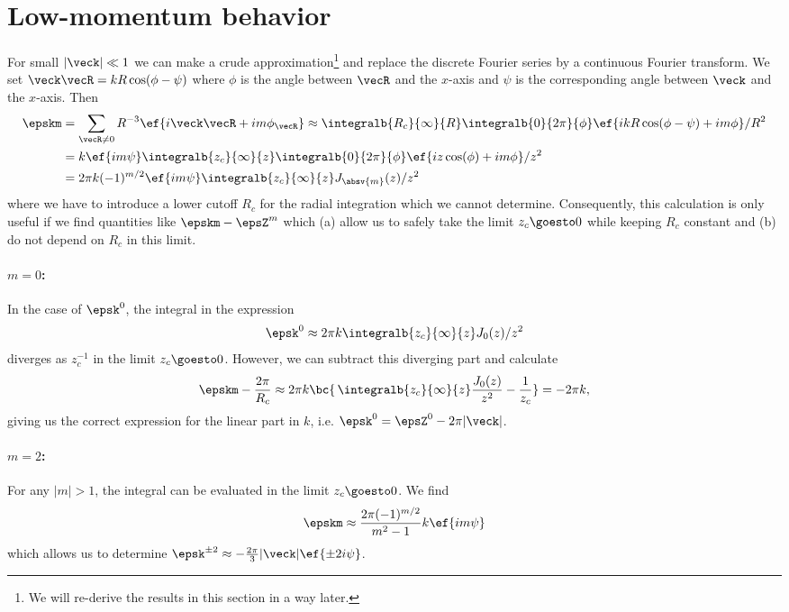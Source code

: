 \section{Low-momentum behavior}
For small $|\veck| \ll 1$ we can make a crude approximation\footnote{We will re-derive the results in this section in a  way later.} and replace the discrete Fourier series
by a continuous Fourier transform. We set $\veck\vecR = k R \cos(\phi-\psi)$ where
$\phi$ is the angle between $\vecR$ and the $x$-axis and $\psi$ is the
corresponding angle between $\veck$ and the $x$-axis. Then
\begin{align}
    \epskm &= \sum_{\vecR\ne 0} R^{-3} \ef{i\veck\vecR+i m \phi_\vecR}
    \approx \integralb{R_c}{\infty}{R} \integralb{0}{2\pi}{\phi} \ef{ikR \cos(\phi-\psi) + i m \phi} / R^2\\
    &= k \ef{im \psi} \integralb{z_c}{\infty}{z} \integralb{0}{2\pi}{\phi} \ef{i z \cos(\phi) + i m \phi} / z^2\\
    &= 2\pi k (-1)^{m/2} \ef{i m \psi} \integralb{z_c}{\infty}{z} J_{\absv{m}}(z)/z^2
\end{align}
where we have to introduce a lower cutoff $R_c$ for the radial integration which
we cannot determine. Consequently, this calculation is only useful
if we find quantities like $\epskm-\epsZ^m$ which (a) allow
us to safely take the limit $z_c \goesto 0$ while keeping $R_c$ constant and
(b) do not depend on $R_c$ in this limit.

\paragraph{$m=0$:} In the case of $\epsk^0$, the integral in the expression
\begin{align}
    \epsk^0 \approx 2\pi k \integralb{z_c}{\infty}{z} J_0(z)/z^2
\end{align}
diverges as $z_c^{-1}$ in the limit $z_c \goesto 0$. However, we can subtract this diverging part and calculate
\begin{align}
    \epskm - \frac{2\pi}{R_c} \approx 2\pi k \bc{ \, \integralb{z_c}{\infty}{z} \frac{J_0(z)}{z^2} - \frac{1}{z_c} } = -2\pi k,
\end{align}
giving us the correct expression for the linear part in $k$, i.e. $\epsk^0=\epsZ^0 - 2\pi |\veck|$.

\paragraph{$m=2$:} For any $|m|>1$, the integral can be evaluated in the limit $z_c\goesto 0$. We find
\begin{align}
    \epskm \approx \frac{2\pi (-1)^{m/2}}{m^2-1} k \ef{im \psi}
\end{align}
which allows us to determine $\epsk^{\pm 2} \approx -\frac{2\pi}{3} |\veck| \ef{\pm 2 i \psi}$.

